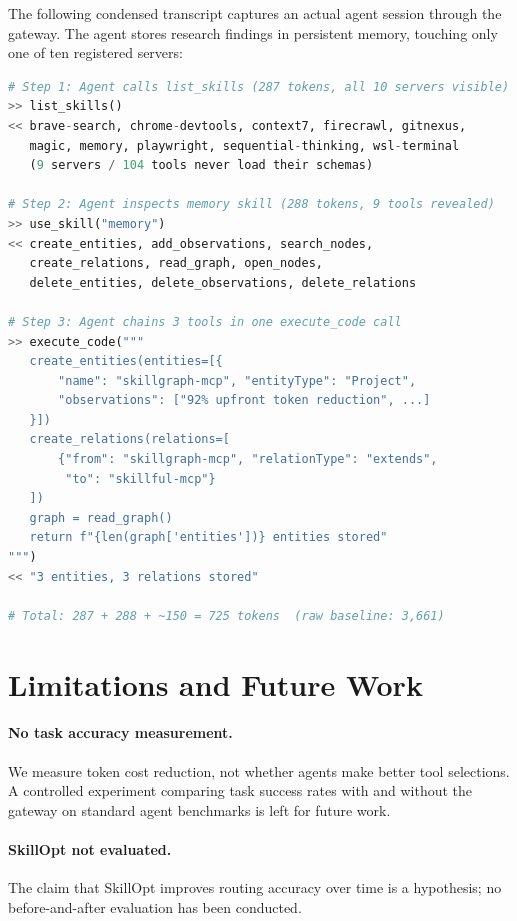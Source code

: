 \documentclass[11pt,a4paper]{article}
\begin{document}
The following condensed transcript captures an actual agent session through the
gateway. The agent stores research findings in persistent memory, touching only one
of ten registered servers:

\begin{lstlisting}[language=Python, caption={Agent interaction via skillgraph-mcp gateway.}]
# Step 1: Agent calls list_skills (287 tokens, all 10 servers visible)
>> list_skills()
<< brave-search, chrome-devtools, context7, firecrawl, gitnexus,
   magic, memory, playwright, sequential-thinking, wsl-terminal
   (9 servers / 104 tools never load their schemas)

# Step 2: Agent inspects memory skill (288 tokens, 9 tools revealed)
>> use_skill("memory")
<< create_entities, add_observations, search_nodes,
   create_relations, read_graph, open_nodes,
   delete_entities, delete_observations, delete_relations

# Step 3: Agent chains 3 tools in one execute_code call
>> execute_code("""
   create_entities(entities=[{
       "name": "skillgraph-mcp", "entityType": "Project",
       "observations": ["92% upfront token reduction", ...]
   }])
   create_relations(relations=[
       {"from": "skillgraph-mcp", "relationType": "extends",
        "to": "skillful-mcp"}
   ])
   graph = read_graph()
   return f"{len(graph['entities'])} entities stored"
""")
<< "3 entities, 3 relations stored"

# Total: 287 + 288 + ~150 = 725 tokens  (raw baseline: 3,661)
\end{lstlisting}

\section{Limitations and Future Work}
\label{sec:limitations}

\paragraph{No task accuracy measurement.}
We measure token cost reduction, not whether agents make better tool selections.
A controlled experiment comparing task success rates with and without the gateway
on standard agent benchmarks is left for future work.

\paragraph{SkillOpt not evaluated.}
The claim that SkillOpt improves routing accuracy over time is a hypothesis; no
before-and-after evaluation has been conducted.
\end{document}
